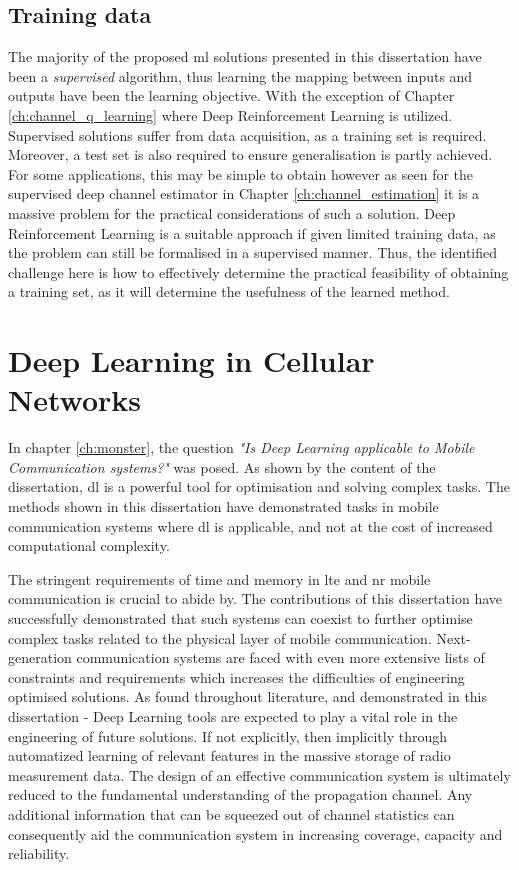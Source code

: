 \subsection{Training data}
The majority of the proposed \gls{ml} solutions presented in this dissertation have been a \emph{supervised} algorithm, thus learning the mapping between inputs and outputs have been the learning objective. With the exception of Chapter \ref{ch:channel_q_learning} where Deep Reinforcement Learning is utilized. Supervised solutions suffer from data acquisition, as a training set is required. Moreover, a test set is also required to ensure generalisation is partly achieved. For some applications, this may be simple to obtain however as seen for the supervised deep channel estimator in Chapter \ref{ch:channel_estimation} it is a massive problem for the practical considerations of such a solution. Deep Reinforcement Learning is a suitable approach if given limited training data, as the problem can still be formalised in a supervised manner. Thus, the identified challenge here is how to effectively determine the practical feasibility of obtaining a training set, as it will determine the usefulness of the learned method. 

\section{Deep Learning in Cellular Networks}

In chapter \ref{ch:monster}, the question \emph{"Is Deep Learning applicable to Mobile Communication systems?"} was posed. As shown by the content of the dissertation, \acrlong{dl} is a powerful tool for optimisation and solving complex tasks. The methods shown in this dissertation have demonstrated tasks in mobile communication systems where \gls{dl} is applicable, and not at the cost of increased computational complexity. 


The stringent requirements of time and memory in \gls{lte} and \gls{nr} mobile communication is crucial to abide by. The contributions of this dissertation have successfully demonstrated that such systems can coexist to further optimise complex tasks related to the physical layer of mobile communication. Next-generation communication systems are faced with even more extensive lists of constraints and requirements which increases the difficulties of engineering optimised solutions. As found throughout literature, and demonstrated in this dissertation - Deep Learning tools are expected to play a vital role in the engineering of future solutions. If not explicitly, then implicitly through automatized learning of relevant features in the massive storage of radio measurement data. The design of an effective communication system is ultimately reduced to the fundamental understanding of the propagation channel. Any additional information that can be squeezed out of channel statistics can consequently aid the communication system in increasing coverage, capacity and reliability.

